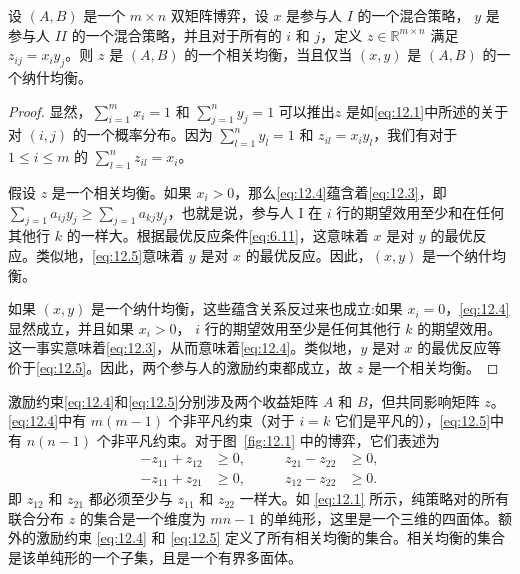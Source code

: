 \begin{proposition}\label{prop:12.2}
设 $(A,B)$ 是一个 \(m \times  n\) 双矩阵博弈，设 \(x\) 是参与人 \(I\) 的一个混合策略， \(y\) 是参与人 \({II}\) 的一个混合策略，并且对于所有的 \(i\) 和 \(j\)，定义 \(z \in  {\mathbb{R}}^{m \times  n}\) 满足\({z}_{ij} = {x}_{i}{y}_{j}\)。则 \(z\) 是 $(A,B)$ 的一个相关均衡，当且仅当 $(x,y)$ 是 $(A,B)$ 的一个纳什均衡。
\end{proposition}

\begin{proof}
显然，\(\mathop{\sum }\limits_{{i = 1}}^{m}{x}_{i} = 1\) 和 \(\mathop{\sum }\limits_{{j = 1}}^{n}{y}_{j} = 1\) 可以推出\(z\) 是如\eqref{eq:12.1}中所述的关于对 $(i,j)$ 的一个概率分布。因为 \(\mathop{\sum }\limits_{{l = 1}}^{n}{y}_{l} = 1\) 和 \({z}_{il} = {x}_{i}{y}_{l}\)，我们有对于 \(1 \leq  i \leq  m\) 的 \(\mathop{\sum }\limits_{{l = 1}}^{n}{z}_{il} = {x}_{i}\)。

假设 \(z\) 是一个相关均衡。如果 \({x}_{i} > 0\)，那么\eqref{eq:12.4}蕴含着\eqref{eq:12.3}，即 \(\mathop{\sum }\limits_{{j = 1}}{a}_{ij}{y}_{j} \geq  \mathop{\sum }\limits_{{j = 1}}{a}_{kj}{y}_{j}\)，也就是说，参与人 \(\mathrm{I}\) 在 \(i\) 行的期望效用至少和在任何其他行 \(k\) 的一样大。根据最优反应条件\eqref{eq:6.11}，这意味着 \(x\) 是对 \(y\) 的最优反应。类似地，\eqref{eq:12.5}意味着 \(y\) 是对 \(x\) 的最优反应。因此，$(x,y)$ 是一个纳什均衡。

如果 $(x,y)$ 是一个纳什均衡，这些蕴含关系反过来也成立:如果 \({x}_{i} = 0\)，\eqref{eq:12.4}显然成立，并且如果 \({x}_{i} > 0\)， \(i\) 行的期望效用至少是任何其他行 \(k\) 的期望效用。这一事实意味着\eqref{eq:12.3}，从而意味着\eqref{eq:12.4}。类似地，\(y\) 是对 \(x\) 的最优反应等价于\eqref{eq:12.5}。因此，两个参与人的激励约束都成立，故 \(z\) 是一个相关均衡。
\end{proof}

激励约束\eqref{eq:12.4}和\eqref{eq:12.5}分别涉及两个收益矩阵 \(A\) 和 \(B\)，但共同影响矩阵 \(z\)。\eqref{eq:12.4}中有 \(m\left( {m - 1}\right)\) 个非平凡约束（对于 \(i = k\) 它们是平凡的），\eqref{eq:12.5}中有 \(n\left( {n - 1}\right)\) 个非平凡约束。对于图~\ref{fig:12.1} 中的博弈，它们表述为
\begin{equation}
\begin{aligned}
- z_{11} + z_{12} &\geq 0,
&\qquad z_{21} - z_{22} &\geq 0, \\[-0.7em]
- z_{11} + z_{21} &\geq 0,
&\qquad z_{12} - z_{22} &\geq 0.
\end{aligned}
\label{eq:12.6}
\end{equation}
即 \({z}_{12}\) 和 \({z}_{21}\) 都必须至少与 \({z}_{11}\) 和 \({z}_{22}\) 一样大。如 \eqref{eq:12.1} 所示，纯策略对的所有联合分布 \(z\) 的集合是一个维度为 \({mn} - 1\) 的单纯形，这里是一个三维的四面体。额外的激励约束 \eqref{eq:12.4} 和 \eqref{eq:12.5} 定义了所有相关均衡的集合。相关均衡的集合是该单纯形的一个子集，且是一个有界多面体。

